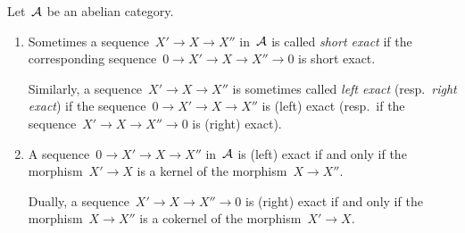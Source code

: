 \begin{remark*}
  \label{language of left and right exact}
  Let~$\mathcal{A}$ be an abelian category.
  \begin{enumerate}
    \item
      Sometimes a sequence~$X' \to X \to X''$ in~$\mathcal{A}$ is called \emph{short exact} if the corresponding sequence~$0 \to X' \to X \to X'' \to 0$ is short exact.
      
      Similarly, a sequence~$X' \to X \to X''$ is sometimes called \emph{left exact} (resp.\ \emph{right exact}) if the sequence~$0 \to X' \to X \to X''$ is (left) exact (resp.\ if the sequence~$X' \to X \to X'' \to 0$ is (right) exact).
    \item
      A sequence~$0 \to X' \to X \to X''$ in~$\mathcal{A}$ is (left) exact if and only if the morphism~$X' \to X$ is a kernel of the morphism~$X \to X''$.
      
      Dually, a sequence~$X' \to X \to X'' \to 0$ is (right) exact if and only if the morphism~$X \to X''$ is a cokernel of the morphism~$X' \to X$.
  \end{enumerate}
\end{remark*}



